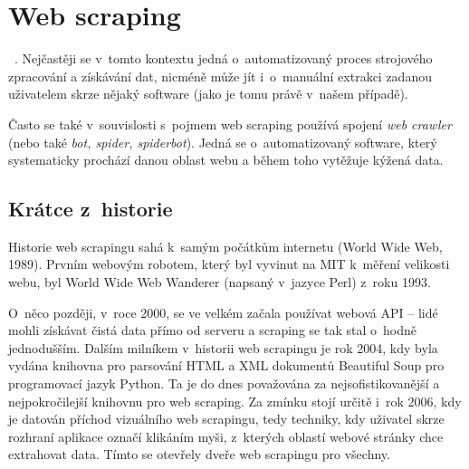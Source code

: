 \documentclass[thesis=B,czech]{FITthesis}[2012/06/26]
\begin{document}

\section{Web scraping}
~\cite[překlad autora]{web_scraping_def}. Nejčastěji se v~tomto kontextu jedná o~automatizovaný proces strojového zpracování a získávání dat, nicméně může jít i~o~manuální extrakci zadanou uživatelem skrze nějaký software (jako je tomu právě v~našem případě).

Často se také v~souvislosti s~pojmem web scraping používá spojení \emph{web crawler} (nebo také \emph{bot, spider, spiderbot}). Jedná se o~automatizovaný software, který systematicky prochází danou oblast webu a během toho vytěžuje kýžená data.~\cite{web_crawler_def}

\subsection{Krátce z~historie}
Historie web scrapingu sahá k~samým počátkům internetu (World Wide Web, 1989). Prvním webovým robotem, který byl vyvinut na MIT k~měření velikosti webu, byl World Wide Web Wanderer (napsaný v~jazyce Perl) z~roku 1993.~\cite{web_wanderer}

O~něco později, v~roce 2000, se ve velkém začala používat webová API -- lidé mohli získávat čistá data přímo od serveru a scraping se tak stal o~hodně jednodušším. Dalším milníkem v~historii web scrapingu je rok 2004, kdy byla vydána knihovna pro parsování HTML a XML dokumentů Beautiful Soup pro programovací jazyk Python. Ta je do dnes považována za nejsofistikovanější a nejpokročilejší knihovnu pro web scraping. Za zmínku stojí určitě i~rok 2006, kdy je datován příchod vizuálního web scrapingu, tedy techniky, kdy uživatel skrze rozhraní aplikace označí klikáním myši, z~kterých oblastí webové stránky chce extrahovat data. Tímto se otevřely dveře web scrapingu pro všechny.~\cite{web_scraping_history}
\end{document}
